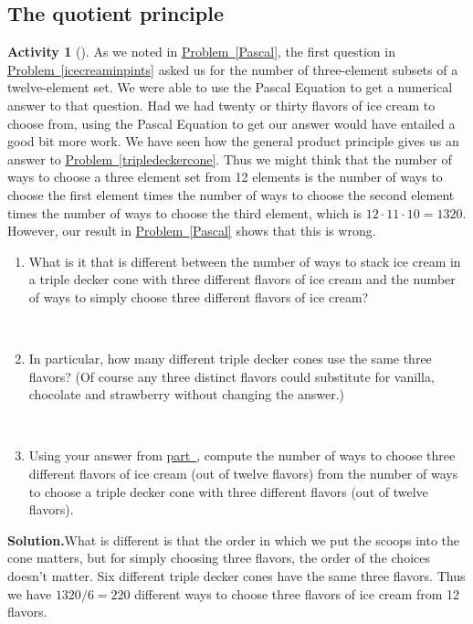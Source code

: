 \documentclass[10pt,]{book}
\theoremstyle{plain}
\theoremstyle{definition}
\newtheorem{activity}[project]{Activity}
\numberwithin{equation}{chapter}
\begin{document}
\subsection[{The quotient principle}]{The quotient principle}\label{subsection-6}
\begin{activity}[]\label{twelvechoosethree}
As we noted in \hyperref[Pascal]{Problem~\ref{Pascal}}, the first question in \hyperref[icecreaminpints]{Problem~\ref{icecreaminpints}} asked us for the number of three-element subsets of a twelve-element set. We were able to use the Pascal Equation to get a numerical answer to that question. Had we had twenty or thirty flavors of ice cream to choose from, using the Pascal Equation to get our answer would have entailed a good bit more work. We have seen how the general product principle gives us an answer to \hyperref[tripledeckercone]{Problem~\ref{tripledeckercone}}. Thus we might think that the number of ways to choose a three element set from 12 elements is the number of ways to choose the first element times the number of ways to choose the second element times the number of ways to choose the third element, which is \(12\cdot11\cdot10=1320\). However, our result in \hyperref[Pascal]{Problem~\ref{Pascal}} shows that this is wrong.%
~\par
\begin{enumerate}[label=(\alph*)]
 \item What is it that is different between the number of ways to stack ice cream in a triple decker cone with three different flavors of ice cream and the number of ways to simply choose three different flavors of ice cream?%

~\par
\item In particular, how many different triple decker cones use the same three flavors?  (Of course any three distinct flavors could substitute for vanilla, chocolate and strawberry without changing the answer.)%

~\par
\item Using your answer from \hyperref[twelvechoosethreethree]{part~}, compute the number of ways to choose three different flavors of ice cream (out of twelve flavors) from the number of ways to choose a triple decker cone with three different flavors (out of twelve flavors).%

\end{enumerate}
\par\medskip\noindent%
\textbf{Solution.}\quad What is different is that the order in which we put the scoops into the cone matters, but for simply choosing three flavors, the order of the choices doesn't matter. Six different triple decker cones have the same three flavors. Thus we have \(1320/6=220\) different ways to choose three flavors of ice cream from 12 flavors.%
\end{activity}
\end{document}
